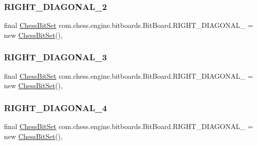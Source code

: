 \subsubsection{\texorpdfstring{RIGHT\_DIAGONAL\_2}{RIGHT\_DIAGONAL\_2}}
{\footnotesize\ttfamily final \mbox{\hyperlink{classcom_1_1chess_1_1engine_1_1bitboards_1_1_chess_bit_set}{Chess\+Bit\+Set}} com.\+chess.\+engine.\+bitboards.\+Bit\+Board.\+R\+I\+G\+H\+T\+\_\+\+D\+I\+A\+G\+O\+N\+A\+L\+\_ = new \mbox{\hyperlink{classcom_1_1chess_1_1engine_1_1bitboards_1_1_chess_bit_set}{Chess\+Bit\+Set}}()\hspace{0.3cm}{\ttfamily [static]}, {\ttfamily [private]}}

\mbox{\label{classcom_1_1chess_1_1engine_1_1bitboards_1_1_bit_board_a05fbfeb73ed231f2aa5b6137f059a816}} 
\subsubsection{\texorpdfstring{RIGHT\_DIAGONAL\_3}{RIGHT\_DIAGONAL\_3}}
{\footnotesize\ttfamily final \mbox{\hyperlink{classcom_1_1chess_1_1engine_1_1bitboards_1_1_chess_bit_set}{Chess\+Bit\+Set}} com.\+chess.\+engine.\+bitboards.\+Bit\+Board.\+R\+I\+G\+H\+T\+\_\+\+D\+I\+A\+G\+O\+N\+A\+L\+\_ = new \mbox{\hyperlink{classcom_1_1chess_1_1engine_1_1bitboards_1_1_chess_bit_set}{Chess\+Bit\+Set}}()\hspace{0.3cm}{\ttfamily [static]}, {\ttfamily [private]}}

\mbox{\label{classcom_1_1chess_1_1engine_1_1bitboards_1_1_bit_board_a1dcc27abde3d74c347c5670aab68ca99}} 
\subsubsection{\texorpdfstring{RIGHT\_DIAGONAL\_4}{RIGHT\_DIAGONAL\_4}}
{\footnotesize\ttfamily final \mbox{\hyperlink{classcom_1_1chess_1_1engine_1_1bitboards_1_1_chess_bit_set}{Chess\+Bit\+Set}} com.\+chess.\+engine.\+bitboards.\+Bit\+Board.\+R\+I\+G\+H\+T\+\_\+\+D\+I\+A\+G\+O\+N\+A\+L\+\_ = new \mbox{\hyperlink{classcom_1_1chess_1_1engine_1_1bitboards_1_1_chess_bit_set}{Chess\+Bit\+Set}}()\hspace{0.3cm}{\ttfamily [static]}, {\ttfamily [private]}}

